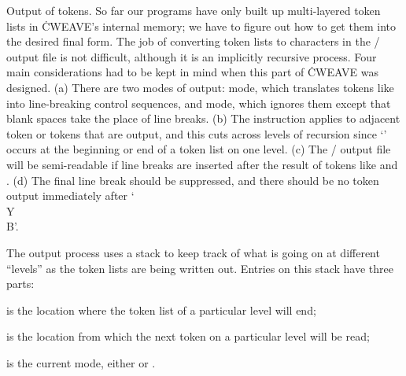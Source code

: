 Output of tokens.
So far our programs have only built up multi-layered token lists in
\.{CWEAVE}'s internal memory; we have to figure out how to get them into
the desired final form. The job of converting token lists to characters in
the \TEX/ output file is not difficult, although it is an implicitly
recursive process. Four main considerations had to be kept in mind when
this part of \.{CWEAVE} was designed. (a) There are two modes of output:
 mode, which translates tokens like  into
line-breaking
control sequences, and  mode, which ignores them except that
blank
spaces take the place of line breaks. (b) The  instruction
applies
to adjacent token or tokens that are output, and this cuts across levels
of recursion since `' occurs at the beginning or end of a token
list on one level. (c) The \TEX/ output file will be semi-readable if line
breaks are inserted after the result of tokens like  and
. (d) The final line break should be suppressed, and there should
be no  token output immediately after `\.{\\Y\\B}'.

\fi

The output process uses a stack to keep track of what is going on at
different ``levels'' as the token lists are being written out. Entries on
this stack have three parts:

\yskip\hang {} is the  location where the
token list of a
particular level will end;

\yskip\hang {} is the  location from which
the next token
on a particular level will be read;

\yskip\hang {} is the current mode, either  or %
.

